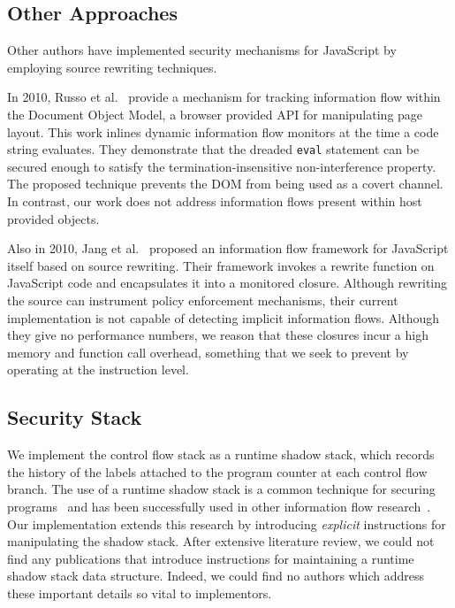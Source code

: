 \subsection{Other Approaches}

Other authors have implemented security mechanisms for JavaScript by employing source rewriting techniques.

In 2010, Russo et al.~\cite{1813092} provide a mechanism for tracking information flow within the Document Object Model, a browser provided API for manipulating page layout.
This work inlines dynamic information flow monitors at the time a code string evaluates.
They demonstrate that the dreaded \texttt{eval} statement can be secured enough to satisfy the termination-insensitive non-interference property.
The proposed technique prevents the DOM from being used as a covert channel.
In contrast, our work does not address information flows present within host provided objects.

Also in 2010, Jang et al.~\cite{1866339} proposed an information flow framework for JavaScript itself based on source rewriting.
Their framework invokes a rewrite function on JavaScript code and encapsulates it into a monitored closure.
Although rewriting the source can instrument policy enforcement mechanisms, their current implementation is not capable of detecting implicit information flows.
Although they give no performance numbers, we reason that these closures incur a high memory and function call overhead, something that we seek to prevent by operating at the instruction level.

\subsection{Security Stack}
\label{sec:relatedwork-security-stack}

We implement the control flow stack as a runtime shadow stack, which records the history of the labels attached to the program counter at each control flow branch.
The use of a runtime shadow stack is a common technique for securing programs~\cite{abadi2009control, frantzen2001stackghost, prasad2003binary} and has been successfully used in other information flow research~\cite{lam2006general}.
Our implementation extends this research by introducing \emph{explicit} instructions for manipulating the shadow stack.
After extensive literature review, we could not find any publications that introduce instructions for maintaining a runtime shadow stack data structure.
Indeed, we could find no authors which address these important details so vital to implementors.

